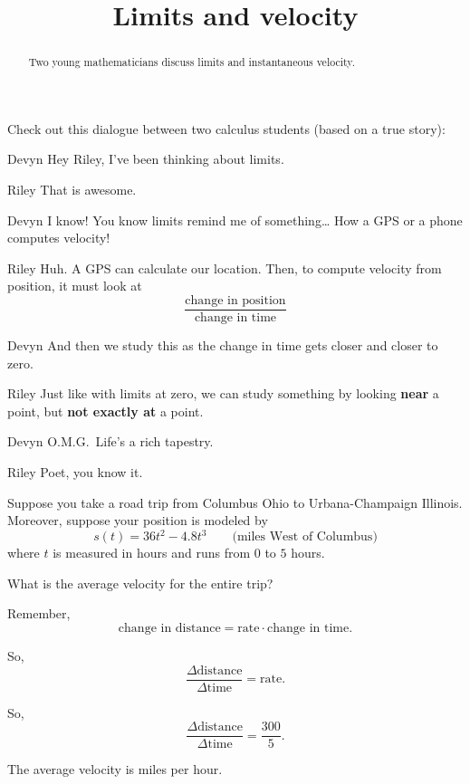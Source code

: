 \documentclass{ximera}
\title[Break-Ground:]{Limits and velocity}
\begin{document}
\begin{abstract}
Two young mathematicians discuss limits and instantaneous velocity.
\end{abstract}
\maketitle

Check out this dialogue between two calculus students (based on a true
story):

\begin{dialogue}
\item[Devyn] Hey Riley, I've been thinking about limits.
\item[Riley] That is awesome.
\item[Devyn] I know! You know limits remind me of something\dots
  How a GPS or a phone computes velocity!
\item[Riley] Huh.  A GPS can calculate our location.   Then, to compute velocity 
from position, it must look at
  \[
  \frac{\text{change in position}}{\text{change in time}}
  \]
\item[Devyn] And then we study this as the change in time gets closer
  and closer to zero.
\item[Riley] Just like with limits at zero, we can study something by
  looking \textbf{near} a point, but \textbf{not exactly at} a point.
\item[Devyn] O.M.G.\ Life's a rich tapestry.
\item[Riley] Poet, you know it.
\end{dialogue}



Suppose you take a road trip from Columbus Ohio to Urbana-Champaign
Illinois. Moreover, suppose your position is modeled by
\[
s(t) = 36t^2 -4.8t^3 \qquad\text{(miles West of Columbus)} %
\]
where $t$ is measured in hours and runs from $0$ to $5$ hours. 


\begin{problem}
  What is the average velocity for the entire trip?
  \begin{hint}
    Remember, 
    \[
    \text{change in distance} = \text{rate}\cdot\text{change in time}.
    \]
  \end{hint}
  \begin{hint}
    So, 
    \[
    \frac{\Delta\text{distance}}{\Delta\text{time}} = \text{rate}.
    \]
  \end{hint}
  \begin{hint}
    So, 
    \[
    \frac{\Delta\text{distance}}{\Delta\text{time}} = \frac{300}{5}.
    \]
  \end{hint}
  \begin{prompt}
    The average velocity is  miles per hour.
  \end{prompt}
\end{problem}
\end{document}
